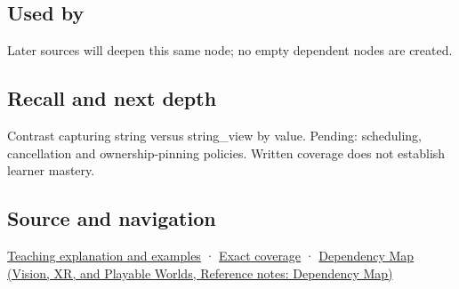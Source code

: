 \subsection{Used by}\label{appendix-aea529eb5175-used-by}

\hypertarget{appendix-aea529eb5175-used-by}{}

Later sources will deepen this same node; no empty dependent nodes are created.

\subsection{Recall and next depth}\label{appendix-aea529eb5175-recall-and-next-depth}

\hypertarget{appendix-aea529eb5175-recall-and-next-depth}{}

Contrast capturing string versus string\_view by value. Pending: scheduling, cancellation and ownership-pinning policies. Written coverage does not establish learner mastery.

\subsection{Source and navigation}\label{appendix-aea529eb5175-source-and-navigation}

\hypertarget{appendix-aea529eb5175-source-and-navigation}{}

\hyperref[01-foundations-i-ch003-borrowed-views-and-deferred-work-need-an-owner-story]{Teaching explanation and examples} · \hyperref[appendix-fd090d982a15-m008---parts-113-126]{Exact coverage} · \href{../07-Vision-XR-and-Playable-Worlds/main.pdf\#nameddest=appendix-4ad47bdd269a}{Dependency Map (Vision, XR, and Playable Worlds, Reference notes: Dependency Map)}

